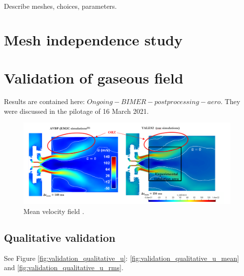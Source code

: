Describe meshes, choices, parameters.

\section{Mesh independence study}

\section{Validation of gaseous field}

Results are contained here: $Ongoing - BIMER - postprocessing - aero$. They were discussed in the pilotage of 16 March 2021.


\begin{figure}[h!]
	\centering
	\includegraphics[scale=0.7]{./part3_applications/figures_ch7_aero/quantitative_view_mean_velocity_field}
	\caption{Mean velocity field .}
	\label{fig:quantitative_view_mean_velocity_field}
\end{figure}


\subsection{Qualitative validation}


See Figure \ref{fig:validation_qualitative_u}: \ref{fig:validation_qualitative_u_mean} and \ref{fig:validation_qualitative_u_rms}.


